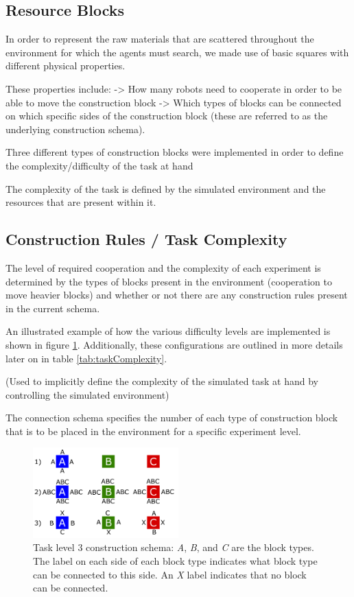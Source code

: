 \subsection{Resource Blocks}

In order to represent the raw materials that are scattered throughout the environment for which the agents must search, we made use of basic squares with different physical properties.

These properties include:
-> How many robots need to cooperate in order to be able to move the construction block
-> Which types of blocks can be connected on which specific sides of the construction block (these are referred to as the underlying construction schema).

Three different types of construction blocks were implemented in order to define the complexity/difficulty of the task at hand

The complexity of the task is defined by the simulated environment and the resources that are present within it.

\subsection{Construction Rules / Task Complexity}

The level of required cooperation and the complexity of each experiment is determined by the types of blocks present in the environment (cooperation to move heavier blocks) and whether or not there are any construction rules present in the current schema.

An illustrated example of how the various difficulty levels are implemented is shown in figure \ref{fig:constructionSchema}.
Additionally, these configurations are outlined in more details later on in table \ref{tab:taskComplexity}.

(Used to implicitly define the complexity of the simulated task at hand by controlling the simulated environment)

The connection schema specifies the number of each type of construction block that is to be placed in the environment for a specific experiment level. 

\begin{figure}[t]
	\centering
	\includegraphics[width=0.5\textwidth]{Figures/ConstructionSchema_2.PNG}
	\caption{Task level 3 construction schema: \textit{A}, \textit{B}, and \textit{C} are the block types.  The label on
each side of each block type indicates what block type can be connected to this side.  An \textit{X} label indicates
that no block can be connected.}\label{fig:constructionSchema}
\end{figure}

